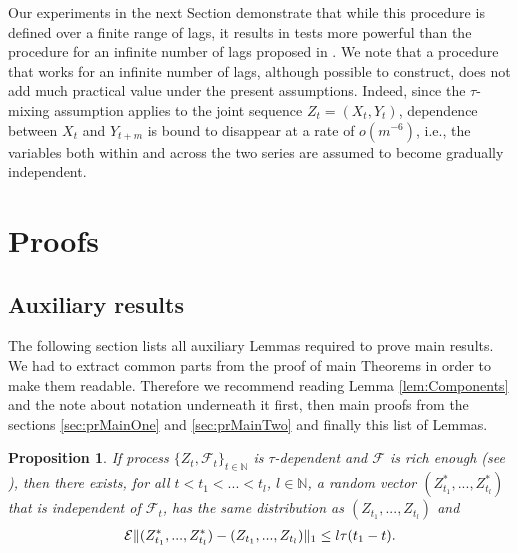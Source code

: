 \documentclass{article} %
\newtheorem{proposition}{Proposition}
\newcommand{\ev}{\mathcal{E}}
\DeclarePairedDelimiter\norm{\lVert}{\rVert}
\begin{document}
Our experiments in the next Section demonstrate that while this procedure is defined over a finite range of lags, it results in tests  more powerful than the procedure for an infinite number of lags proposed in \cite{besserve_statistical_2013}. 
We note that a procedure that works for an infinite number of lags, although possible to construct, does not add much practical value under the present assumptions. Indeed,  since the $\tau$-mixing assumption applies to the joint sequence $Z_t=(X_t,Y_t)$, dependence between $X_t$ and $Y_{t+m}$ is bound to disappear at a rate of $o(m^{-6})$, i.e., the variables both within and across the two series are assumed to become gradually independent.     

\vspace{-2mm}


\small



\newpage
\normalsize
\appendix
\section{Proofs}

\subsection{Auxiliary results }
\label{label:aux}
The following section lists all auxiliary Lemmas required to prove main results. We had to extract common parts from the proof of main Theorems in order to make them readable. Therefore we recommend reading Lemma \ref{lem:Components} and the note about notation underneath it first, then main proofs from the sections \ref{sec:prMainOne} and \ref{sec:prMainTwo} and finally this list of Lemmas. 

\begin{proposition}{\cite[p.259, Equation 2.1]{leucht_dependent_2013}}
\label{prop:Coupling}
If process  $\{Z_t,\mathcal{F}_t\}_{t \in \mathbb{N}}$  is $\tau$-dependent and $\mathcal{F}$ is rich enough (see \cite[Lemma 5.3]{dedecker2007weak}), then there exists, for all $t<t_1<...<t_l$, $l \in \mathbb N$, a random vector $(Z_{t_1}^*,...,Z_{t_l}^*)$ that is independent of $\mathcal F_t$, has the same distribution  as $(Z_{t_1},...,Z_{t_l})$ and 
\begin{align*}
\ev \norm{(Z_{t_1}^*,...,Z_{t_l}^*) - (Z_{t_1},...,Z_{t_l})}_1 \leq l \tau(t_1-t).
\end{align*}
\end{proposition}
\end{document}
